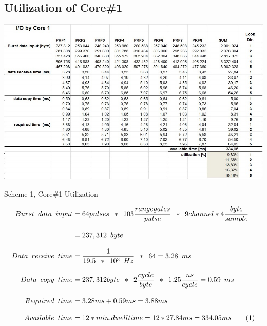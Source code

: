 \subsection{Utilization of Core\#1}
\begin{table}[h!]
	\centering
	\includegraphics[width=150mm]{figures/aa_scheme1_cpu_util_1}
	\caption{Scheme-1, Core\#1 Utilization}
	\label{fig:existing_analysis:aa_scheme1_cpu_util1}
\end{table}
\begin{align*}
	\label{aa:scheme1:core1:equ}
	Burst \enspace data \enspace input & = 64 pulses \enspace * \enspace 103 \frac{range gates}{pulse} \enspace * \enspace 9channel * 4\frac{byte}{sample}\\[0.3cm]
	& = 237,312 \enspace byte \\[0.3cm]
	Data \enspace receive \enspace time &= \frac{1}{19.5 \enspace * \enspace 10^{3} \enspace Hz} \enspace * \enspace 64 = 3.28 \enspace ms \\[0.3cm]
	Data \enspace copy \enspace time &= 237,312 byte \enspace * \enspace 2\frac{cycle}{byte} \enspace * \enspace 1.25\frac{ns}{cycle} = 0.59 \enspace ms \\[0.3cm]
	Required \enspace time &= 3.28ms + 0.59ms =  3.88ms\\[0.3cm]
	Available \enspace time &= 12 * min.dwelltime = 12*27.84ms = 334.05ms \stepcounter{equation}\tag{\theequation} 
\end{align*}

